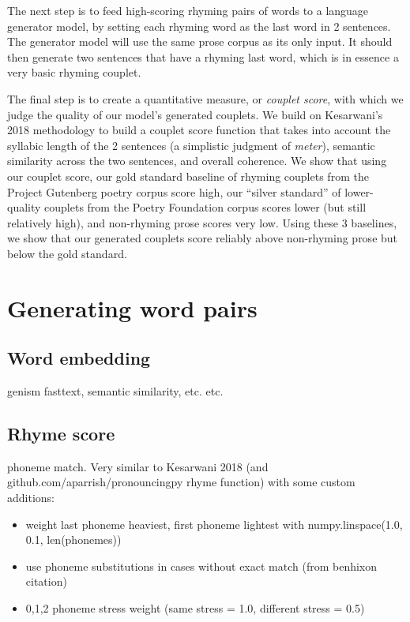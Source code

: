 \documentclass[11pt,a4paper]{article}
\begin{document}
The next step is to feed high-scoring rhyming pairs of words to a language generator model, by setting each rhyming word as the last word in 2 sentences. The generator model will use the same prose corpus as its only input. It should then generate two sentences that have a rhyming last word, which is in essence a very basic rhyming couplet.

The final step is to create a quantitative measure, or \textit{couplet score}, with which we judge the quality of our model's generated couplets. We build on Kesarwani's 2018 methodology to build a couplet score function that takes into account the syllabic length of the 2 sentences (a simplistic judgment of \textit{meter}), semantic similarity across the two sentences, and overall coherence. We show that using our couplet score, our gold standard baseline of rhyming couplets from the Project Gutenberg poetry corpus score high, our ``silver standard'' of lower-quality couplets from the Poetry Foundation corpus scores lower (but still relatively high), and non-rhyming prose scores very low. Using these 3 baselines, we show that our generated couplets score reliably above non-rhyming prose but below the gold standard.

\section{Generating word pairs}
\label{sec:wordpair}

\subsection{Word embedding}

genism fasttext, semantic similarity, etc. etc.

\subsection{Rhyme score}

phoneme match. Very similar to Kesarwani 2018 (and github.com/aparrish/pronouncingpy rhyme function) with some custom additions:

\begin{itemize}
	\item
		weight last phoneme heaviest, first phoneme lightest with numpy.linspace(1.0, 0.1, len(phonemes))
	\item
		use phoneme substitutions in cases without exact match (from benhixon citation)
	\item
		0,1,2 phoneme stress weight (same stress = 1.0, different stress = 0.5)
\end{itemize}
\end{document}

